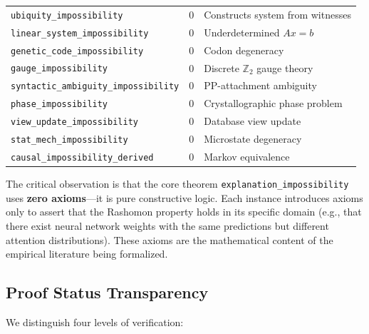\documentclass[11pt,a4paper]{article}
\begin{document}
\begin{table}[ht]
\begin{tabular}{@{}lrl@{}}
\texttt{ubiquity\_impossibility} & 0 & Constructs system from witnesses \\
\texttt{linear\_system\_impossibility} & 0 & Underdetermined $Ax=b$ \\
\texttt{genetic\_code\_impossibility} & 0 & Codon degeneracy \\
\texttt{gauge\_impossibility} & 0 & Discrete $\mathbb{Z}_2$ gauge theory \\
\texttt{syntactic\_ambiguity\_impossibility} & 0 & PP-attachment ambiguity \\
\texttt{phase\_impossibility} & 0 & Crystallographic phase problem \\
\texttt{view\_update\_impossibility} & 0 & Database view update \\
\texttt{stat\_mech\_impossibility} & 0 & Microstate degeneracy \\
\texttt{causal\_impossibility\_derived} & 0 & Markov equivalence \\
\bottomrule
\end{tabular}
\end{table}

The critical observation is that the core theorem
\texttt{explanation\_impossibility} uses \textbf{zero axioms}---it is pure
constructive logic.  Each instance introduces axioms only to assert that the
Rashomon property holds in its specific domain (e.g., that there exist
neural network weights with the same predictions but different attention
distributions).  These axioms are the mathematical content of the empirical
literature being formalized.

\subsection{Proof Status Transparency}
\label{sec:proof-status}

We distinguish four levels of verification:
\end{document}
